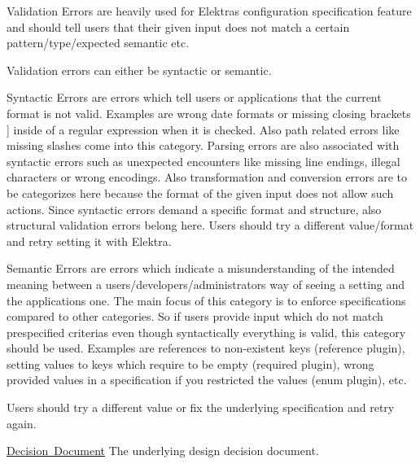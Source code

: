 {\ttfamily Validation Errors} are heavily used for Elektra\textquotesingle{}s {\ttfamily configuration specification} feature and should tell users that their given input does not match a certain pattern/type/expected semantic etc.

Validation errors can either be syntactic or semantic.

{\ttfamily Syntactic Errors} are errors which tell users or applications that the current format is not valid. Examples are wrong date formats or missing closing brackets {\ttfamily \mbox{]}} inside of a regular expression when it is checked. Also path related errors like missing slashes come into this category. Parsing errors are also associated with syntactic errors such as unexpected encounters like missing line endings, illegal characters or wrong encodings. Also transformation and conversion errors are to be categorizes here because the format of the given input does not allow such actions. Since syntactic errors demand a specific format and structure, also structural validation errors belong here. Users should try a different value/format and retry setting it with Elektra.

{\ttfamily Semantic Errors} are errors which indicate a misunderstanding of the intended meaning between a user\textquotesingle{}s/developer\textquotesingle{}s/administrator\textquotesingle{}s way of seeing a setting and the application\textquotesingle{}s one. The main focus of this category is to enforce specifications compared to other categories. So if users provide input which do not match prespecified criterias even though syntactically everything is valid, this category should be used. Examples are references to non-\/existent keys ({\ttfamily reference} plugin), setting values to keys which require to be empty ({\ttfamily required} plugin), wrong provided values in a specification if you restricted the values ({\ttfamily enum} plugin), etc.

Users should try a different value or fix the underlying specification and retry again.


\begin{DoxyItemize}
\item \mbox{\hyperlink{doc_decisions_error_codes_md}{Decision Document}} The underlying design decision document. 
\end{DoxyItemize}
